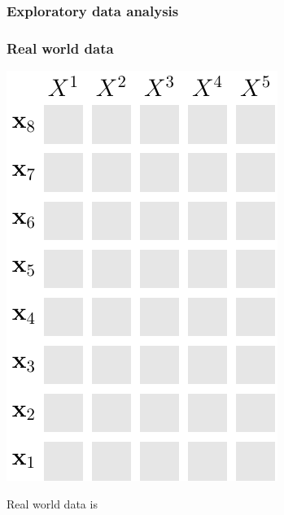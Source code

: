 \documentclass[xcolor={usenames,dvipsnames,svgnames}, compress, aspectratio=169, 11pt]{beamer}
\begin{document}
{
  \begin{frame}
    \titlepage
  \end{frame}
}



  



\begin{frame}[t, htt=bgrey2]
  \frametitle{Exploratory data analysis}
  
\end{frame}

\begin{frame}[t, htt=bgrey2]
  \frametitle{Real world data}

  \large
  \begin{minipage}[t]{0.6\linewidth}
    \includegraphics[width=.4\linewidth]{figures/abda-grid-empty}
  \end{minipage}\hfill\begin{minipage}[t]{0.3\linewidth}
    \vspace{-150pt}
    Real world data is\par
  \end{minipage}  
\end{frame}
\end{document}
